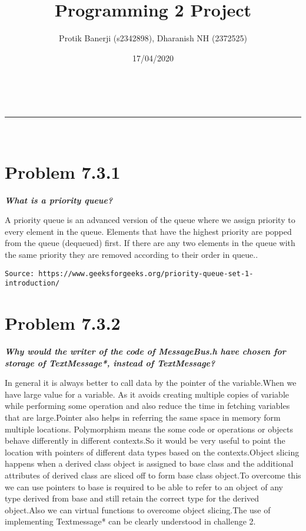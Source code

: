 \documentclass[a4paper,11pt]{article}
\makeatletter
\newcommand{\linia}{\rule{\linewidth}{0.5pt}}
\theoremstyle{mytheor}
\renewcommand{\maketitle}{
\begin{center}
\vspace{2ex}
{\huge \textsc{\@title}}
\vspace{1ex}
\\
\linia\\
\@author \hfill \@date
\vspace{4ex}
\end{center}
}
\makeatother
\begin{document}
\title{Programming 2 Project}

\author{Protik Banerji (s2342898), Dharanish NH (2372525)}

\date{17/04/2020}

\maketitle

\section*{Problem 7.3.1}

\textbf{\textit{What is a priority queue?}}

A priority queue is an advanced version of the queue where we assign priority to every element in the queue. Elements that have the highest priority are popped from the queue (dequeued) first. If there are any two elements in the queue with the same priority they are removed according to their order in queue..

\texttt{Source: https://www.geeksforgeeks.org/priority-queue-set-1-introduction/}

\section*{Problem 7.3.2}
\textbf{\textit{Why would the writer of the code of MessageBus.h have chosen for storage of TextMessage*, instead of TextMessage?}}

In general it is always better to call data by the pointer of the variable.When we have large value for a variable. As it avoids creating multiple copies of variable while performing some operation and also reduce the time in fetching variables that are large.Pointer also helps in referring the same space in memory form multiple locations.
Polymorphism means the some code or operations or objects behave differently in different contexts.So it would be very useful to point the location with pointers of different data types based on the contexts.Object slicing happens when a derived class object is assigned to base class and the additional attributes of derived class are sliced off to form base class object.To overcome this we can use pointers to base is required to be able to refer to an object of any type derived from base and still retain the correct type for the derived object.Also we can virtual functions to overcome object slicing.The use of implementing Textmessage* can be clearly understood in challenge 2.
\end{document}
